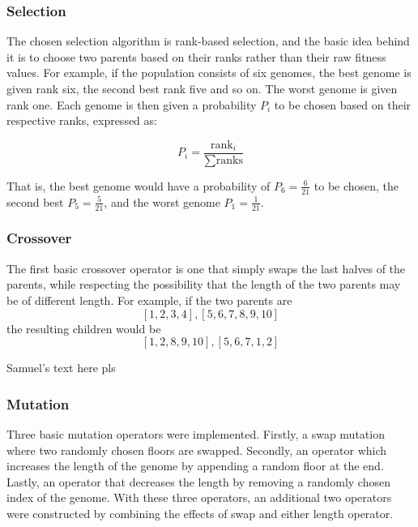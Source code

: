 \subsubsection{Selection}

    The chosen selection algorithm is rank-based selection, and the basic idea behind it is to choose two parents based on their ranks rather than their raw fitness values. For example, if the population consists of six genomes, the best genome is given rank six, the second best rank five and so on. The worst genome is given rank one. Each genome is then given a probability $ P_i $ to be chosen based on their respective ranks, expressed as:

    $$ P_i = \frac{\text{rank}_i}{\sum \text{ranks}} $$

    That is, the best genome would have a probability of $ P_6 = \frac{6}{21} $ to be chosen, the second best $ P_5 = \frac{5}{21} $, and the worst genome $ P_1 = \frac{1}{21} $.

\subsubsection{Crossover}

	The first basic crossover operator is one that simply swaps the last halves of the parents, while respecting the possibility that the length of the two parents may be of different length. For example, if the two parents are $$ [1, 2, 3, 4], [5, 6, 7, 8, 9, 10] $$ the resulting children would be $$ [1, 2, 8, 9, 10], [5, 6, 7, 1, 2] $$

    Samuel's text here pls

\subsubsection{Mutation}

	Three basic mutation operators were implemented. Firstly, a swap mutation where two randomly chosen floors are swapped. Secondly, an operator which increases the length of the genome by appending a random floor at the end. Lastly, an operator that decreases the length by removing a randomly chosen index of the genome. With these three operators, an additional two operators were constructed by combining the effects of swap and either length operator.


